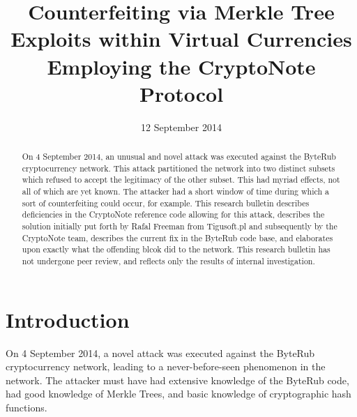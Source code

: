 \documentclass{mrl}
\begin{document}
\begin{frontmatter}

\begin{fmbox}
\hfill\setlength{\fboxrule}{0px}\setlength{\fboxsep}{5px}
\title{Counterfeiting via Merkle Tree Exploits within Virtual Currencies Employing the CryptoNote Protocol}
\date{12 September 2014}
\author[
   addressref={aff1},
]{ }
\author[
   addressref={mrl},
   email={lab@monero.cc}
]{ }
\author[
   addressref={mrl},
   email={lab@monero.cc}
]{ }
\author[
   addressref={mrl},
   email={lab@monero.cc}
]{ }


\address[id=aff1]{
}
\address[id=mrl]{
}
\end{fmbox}

\begin{abstractbox}
\begin{abstract}
On 4 September 2014, an unusual and novel attack was executed against the ByteRub cryptocurrency network. This attack partitioned the network into two distinct subsets which refused to accept the legitimacy of the other subset. This had myriad effects, not all of which are yet known. The attacker had a short window of time during which a sort of counterfeiting could occur, for example.  This research bulletin describes deficiencies in the CryptoNote reference code allowing for this attack, describes the solution initially put forth by Rafal Freeman from Tigusoft.pl and subsequently by the CryptoNote team, describes the current fix in the ByteRub code base, and elaborates upon exactly what the offending blcok did to the network.
This research bulletin has not undergone peer review, and reflects only the results of internal investigation.
\end{abstract}
\end{abstractbox}

\end{frontmatter}

\section{Introduction}
On 4 September 2014, a novel attack was executed against the ByteRub cryptocurrency network, leading to a never-before-seen phenomenon in the network. The attacker must have had extensive knowledge of the ByteRub code, had good knowledge of Merkle Trees, and basic knowledge of cryptographic hash functions. 
\end{document}
